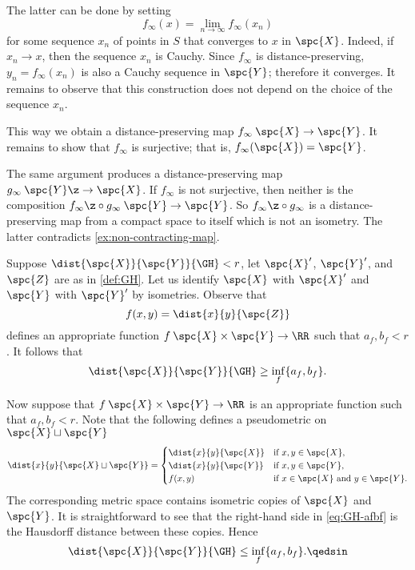 The latter can be done by setting 
$$f_\infty(x)=\lim_{n\to\infty} f_\infty(x_n)$$ 
for some sequence $x_n$ of points  in $S$
that converges to $x$ in $\spc{X}$.
Indeed, if $x_n\to x$, then the sequence $x_n$ is Cauchy.
Since $f_\infty$ is distance-preserving, $y_n=f_\infty(x_n)$ is also a Cauchy sequence in $\spc{Y}$;
therefore it converges.
It remains to observe that this construction does not depend on the choice of the sequence $x_n$.

This way we obtain a distance-preserving map $f_\infty\:\spc{X}\to \spc{Y}$. 
It remains to show that $f_\infty$ is surjective; that is, $f_\infty(\spc{X})=\spc{Y}$.

The same argument produces a distance-preserving map $g_\infty\:\spc{Y}\z\to \spc{X}$.
If $f_\infty$ is not surjective, then neither is the composition $f_\infty\z\circ g_\infty\:\spc{Y}\to \spc{Y}$.
So $f_\infty \z\circ g_\infty$ is a distance-preserving map from a compact space to itself which is not an isometry.
The latter contradicts \ref{ex:non-contracting-map}. 
\qeds
















Suppose $\dist{\spc{X}}{\spc{Y}}{\GH}<r$, let $\spc{X}'$, $\spc{Y}'$, and $\spc{Z}$ are as in \ref{def:GH}.
Let us identify $\spc{X}$ with $\spc{X}'$ and  $\spc{Y}$ with $\spc{Y}'$ by isometries.
Observe that  
\[f(x,y)=\dist{x}{y}{\spc{Z}}\]
defines an appropriate function $f\:\spc{X}\times\spc{Y}\to\RR$ such that 
$a_f,b_f<r$.
It follows that 
\[\dist{\spc{X}}{\spc{Y}}{\GH}\ge\inf_f\{a_f,b_f\}.\]

Now suppose that $f\:\spc{X}\times\spc{Y}\to\RR$ is an appropriate function such that 
$a_f,b_f<r$.
Note that the following defines a pseudometric on $\spc{X}\sqcup\spc{Y}$
\[\dist{x}{y}{\spc{X}\sqcup\spc{Y}}=
\begin{cases}
\dist{x}{y}{\spc{X}}&\text{if\ } x,y\in \spc{X},
\\
\dist{x}{y}{\spc{Y}}&\text{if\ } x,y\in \spc{Y},
\\
f(x,y)&\text{if\ } x\in \spc{X}\ \text{and}\ y\in \spc{Y}.
\end{cases}
\]
The corresponding metric space contains isometric copies of $\spc{X}$ and $\spc{Y}$.
It is straightforward to see that the right-hand side in \ref{eq:GH-afbf} is the Hausdorff distance between these copies.
Hence 
\[\dist{\spc{X}}{\spc{Y}}{\GH}\le\inf_f\{a_f,b_f\}.\qedsin\]

















